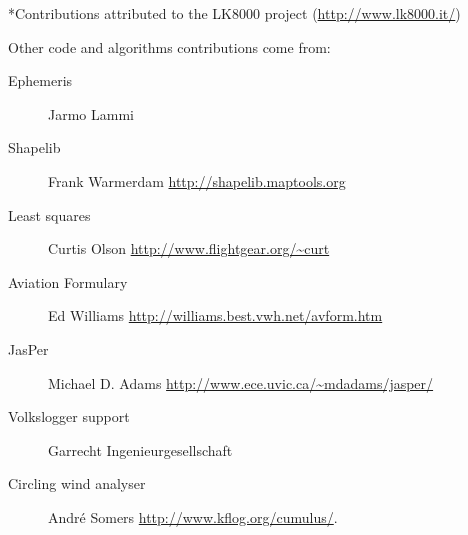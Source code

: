 *Contributions attributed to the LK8000 project (\url{http://www.lk8000.it/})


Other code and algorithms contributions come from:
\begin{description}
\item[Ephemeris] Jarmo Lammi
\item[Shapelib] Frank Warmerdam \url{http://shapelib.maptools.org}
\item[Least squares] Curtis Olson \url{http://www.flightgear.org/~curt}
\item[Aviation Formulary] Ed Williams \url{http://williams.best.vwh.net/avform.htm}
\item[JasPer] Michael D. Adams \url{http://www.ece.uvic.ca/~mdadams/jasper/}
\item[Volkslogger support] Garrecht Ingenieurgesellschaft
\item[Circling wind analyser] Andr\'e Somers \url{http://www.kflog.org/cumulus/}.
\end{description}

